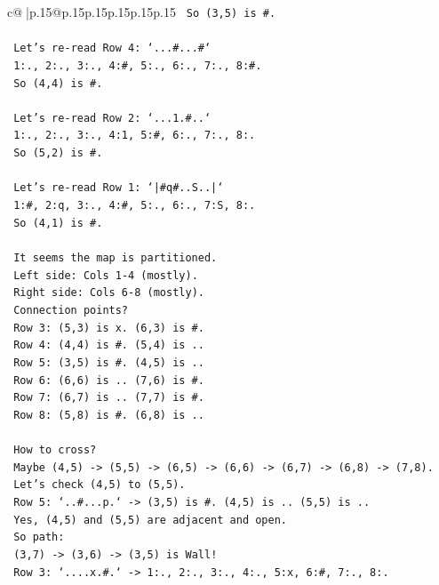 \documentclass{article}
\begin{document}
{\begin{supertabular}{c@{$\;$}|p{.15\linewidth}@{}p{.15\linewidth}p{.15\linewidth}p{.15\linewidth}p{.15\linewidth}p{.15\linewidth}}
{{{\texttt{  So (3,5) is \#.} \\
\\ 
\texttt{  Let's re{-}read Row 4: `...\#...\#`} \\
\texttt{  1:., 2:., 3:., 4:\#, 5:., 6:., 7:., 8:\#.} \\
\texttt{  So (4,4) is \#.} \\
\\ 
\texttt{  Let's re{-}read Row 2: `...1.\#..`} \\
\texttt{  1:., 2:., 3:., 4:1, 5:\#, 6:., 7:., 8:.} \\
\texttt{  So (5,2) is \#.} \\
\\ 
\texttt{  Let's re{-}read Row 1: `|\#q\#..S..|`} \\
\texttt{  1:\#, 2:q, 3:., 4:\#, 5:., 6:., 7:S, 8:.} \\
\texttt{  So (4,1) is \#.} \\
\\ 
\texttt{  It seems the map is partitioned.} \\
\texttt{  Left side: Cols 1{-}4 (mostly).} \\
\texttt{  Right side: Cols 6{-}8 (mostly).} \\
\texttt{  Connection points?} \\
\texttt{  Row 3: (5,3) is x. (6,3) is \#.} \\
\texttt{  Row 4: (4,4) is \#. (5,4) is ..} \\
\texttt{  Row 5: (3,5) is \#. (4,5) is ..} \\
\texttt{  Row 6: (6,6) is .. (7,6) is \#.} \\
\texttt{  Row 7: (6,7) is .. (7,7) is \#.} \\
\texttt{  Row 8: (5,8) is \#. (6,8) is ..} \\
\\ 
\texttt{  How to cross?} \\
\texttt{  Maybe (4,5) {-}> (5,5) {-}> (6,5) {-}> (6,6) {-}> (6,7) {-}> (6,8) {-}> (7,8).} \\
\texttt{  Let's check (4,5) to (5,5).} \\
\texttt{  Row 5: `..\#...p.` {-}> (3,5) is \#. (4,5) is .. (5,5) is ..} \\
\texttt{  Yes, (4,5) and (5,5) are adjacent and open.} \\
\texttt{  So path:} \\
\texttt{  (3,7) {-}> (3,6) {-}> (3,5) is Wall!} \\
\texttt{  Row 3: `....x.\#.` {-}> 1:., 2:., 3:., 4:., 5:x, 6:\#, 7:., 8:.} \\
}}}
\end{supertabular}}
\end{document}
